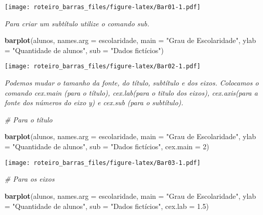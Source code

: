 \documentclass[]{article}
\newenvironment{Shaded}{\begin{snugshade}}{\end{snugshade}}
\newcommand{\CommentTok}[1]{\textcolor[rgb]{0.56,0.35,0.01}{\textit{#1}}}
\newcommand{\DataTypeTok}[1]{\textcolor[rgb]{0.13,0.29,0.53}{#1}}
\newcommand{\DecValTok}[1]{\textcolor[rgb]{0.00,0.00,0.81}{#1}}
\newcommand{\FloatTok}[1]{\textcolor[rgb]{0.00,0.00,0.81}{#1}}
\newcommand{\KeywordTok}[1]{\textcolor[rgb]{0.13,0.29,0.53}{\textbf{#1}}}
\newcommand{\NormalTok}[1]{#1}
\newcommand{\StringTok}[1]{\textcolor[rgb]{0.31,0.60,0.02}{#1}}
\begin{document}
\texttt{[image: roteiro\_barras\_files/figure-latex/Bar01-1.pdf]}

\emph{Para criar um subtítulo utilize o comando sub.}

\begin{Shaded}
\begin{Highlighting}[]
\KeywordTok{barplot}\NormalTok{(alunos, }\DataTypeTok{names.arg =}\NormalTok{ escolaridade, }\DataTypeTok{main =} \StringTok{"Grau de Escolaridade"}\NormalTok{, }
        \DataTypeTok{ylab =} \StringTok{"Quantidade de alunos"}\NormalTok{, }\DataTypeTok{sub =} \StringTok{"Dados fictícios"}\NormalTok{)}
\end{Highlighting}
\end{Shaded}

\texttt{[image: roteiro\_barras\_files/figure-latex/Bar02-1.pdf]}

\emph{Podemos mudar o tamanho da fonte, do título, subtítulo e dos
eixos. Colocamos o comando cex.main (para o título), cex.lab(para o
titulo dos eixos), cex.axis(para a fonte dos números do eixo y) e
cex.sub (para o subtítulo).}

\begin{Shaded}
\begin{Highlighting}[]
\CommentTok{# Para o título}

\KeywordTok{barplot}\NormalTok{(alunos, }\DataTypeTok{names.arg =}\NormalTok{ escolaridade, }\DataTypeTok{main =} \StringTok{"Grau de Escolaridade"}\NormalTok{, }
        \DataTypeTok{ylab =} \StringTok{"Quantidade de alunos"}\NormalTok{, }\DataTypeTok{sub =} \StringTok{"Dados fictícios"}\NormalTok{, }\DataTypeTok{cex.main =} \DecValTok{2}\NormalTok{)}
\end{Highlighting}
\end{Shaded}

\texttt{[image: roteiro\_barras\_files/figure-latex/Bar03-1.pdf]}

\begin{Shaded}
\begin{Highlighting}[]
\CommentTok{# Para os eixos}

\KeywordTok{barplot}\NormalTok{(alunos, }\DataTypeTok{names.arg =}\NormalTok{ escolaridade, }\DataTypeTok{main =} \StringTok{"Grau de Escolaridade"}\NormalTok{, }
        \DataTypeTok{ylab =} \StringTok{"Quantidade de alunos"}\NormalTok{, }\DataTypeTok{sub =} \StringTok{"Dados fictícios"}\NormalTok{, }\DataTypeTok{cex.lab =} \FloatTok{1.5}\NormalTok{)}
\end{Highlighting}
\end{Shaded}
\end{document}

